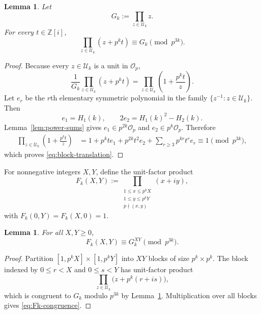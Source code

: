 \documentclass[a4paper,american,11pt]{amsart}
\numberwithin{equation}{section}
\newtheorem{lemma}[theorem]{Lemma}
\theoremstyle{definition}
\newcommand{\Z}{\mathbb Z}
\newcommand{\Op}{\mathcal O_p}
\begin{document}
\begin{lemma}\label{lem:block-translation}
Let
\[
G_k:=\prod_{z\in\mathcal U_k}z.
\]
For every $t\in\Z[i]$,
\begin{equation}\label{eq:block-translation}
\prod_{z\in\mathcal U_k}(z+p^kt)
\equiv
G_k
\pmod{p^{3k}}.
\end{equation}
\end{lemma}

\begin{proof}
Because every $z\in\mathcal U_k$ is a unit in $\Op$,
\[
\frac{1}{G_k}\prod_{z\in\mathcal U_k}(z+p^kt)
=
\prod_{z\in\mathcal U_k}
\left(1+\frac{p^kt}{z}\right).
\]
Let $e_r$ be the $r$th elementary symmetric polynomial in the family $\{z^{-1}:z\in\mathcal U_k\}$. Then
\[
e_1=H_1(k),
\qquad
2e_2=H_1(k)^2-H_2(k).
\]
Lemma~\ref{lem:power-sums} gives $e_1\in p^{2k}\Op$ and $e_2\in p^k\Op$. Therefore
\begin{align*}
\prod_{z\in\mathcal U_k}
\left(1+\frac{p^kt}{z}\right)
&=
1+p^kt e_1+p^{2k}t^2e_2
+
\sum_{r\geq3}p^{kr}t^re_r
\equiv 1\pmod{p^{3k}},
\end{align*}
which proves \eqref{eq:block-translation}.
\end{proof}

For nonnegative integers $X,Y$, define the unit-factor product
\begin{equation}\label{eq:def-Fk}
F_k(X,Y)
:=
\prod_{\substack{1\leq x\leq p^kX\\1\leq y\leq p^kY\\p\nmid(x,y)}}(x+iy),
\end{equation}
with $F_k(0,Y)=F_k(X,0)=1$.

\begin{lemma}\label{lem:complete-rectangles}
For all $X,Y\geq0$,
\begin{equation}\label{eq:Fk-congruence}
F_k(X,Y)\equiv G_k^{XY}\pmod{p^{3k}}.
\end{equation}
\end{lemma}

\begin{proof}
Partition $[1,p^kX]\times[1,p^kY]$ into $XY$ blocks of size $p^k\times p^k$. The block indexed by $0\leq r<X$ and $0\leq s<Y$ has unit-factor product
\[
\prod_{z\in\mathcal U_k}\bigl(z+p^k(r+is)\bigr),
\]
which is congruent to $G_k$ modulo $p^{3k}$ by Lemma~\ref{lem:block-translation}. Multiplication over all blocks gives \eqref{eq:Fk-congruence}.
\end{proof}
\end{document}

